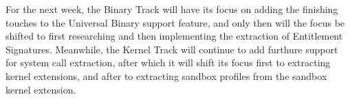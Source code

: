 
For the next week, the Binary Track will have its focus on adding the
finishing touches to the Universal Binary support feature, and only then will
the focus be shifted to first researching and then implementing the extraction
of Entitlement Signatures. 
Meanwhile, the Kernel Track will continue to add furthure support for system
call extraction, after which it will shift its focus first to extracting
kernel extensions, and after to extracting sandbox profiles from the sandbox
kernel extension.
